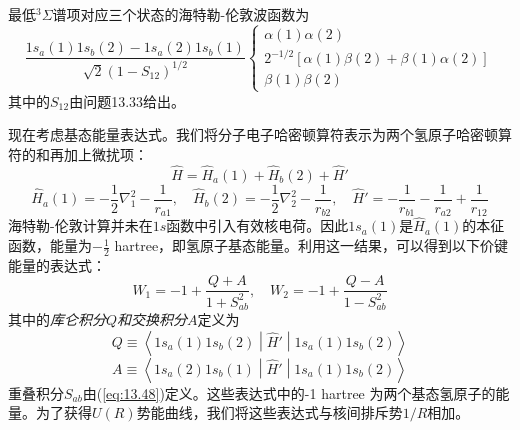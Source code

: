     最低$^3\Sigma$谱项对应三个状态的海特勒-伦敦波函数为
    \begin{equation}
        \frac{
            1s_a\left(1\right)1s_b\left(2\right) - 1s_a\left(2\right)1s_b\left(1\right)
        }{
            \sqrt{2}\left(1 - S_{12}\right)^{1/2}
        } \left\{ 
            \begin{array}{l}
                \alpha\left(1\right)\alpha\left(2\right) \\
                2^{-1/2}\left[\alpha\left(1\right)\beta\left(2\right) + \beta\left(1\right)\alpha\left(2\right)\right] \\
                \beta\left(1\right)\beta\left(2\right)
            \end{array}
            \right.
        \label{eq:13.101}
    \end{equation}
    其中的$S_{12}$由问题13.33给出。

    现在考虑基态能量表达式。我们将分子电子哈密顿算符表示为两个氢原子哈密顿算符的和再加上微扰项：
    \begin{equation}
        \hat{H} = \hat{H}_a\left(1\right) + \hat{H}_b\left(2\right) + \hat{H}'
        \label{eq:13.102}
    \end{equation}
    \begin{equation*}
        \hat{H}_a\left(1\right) = -\frac{1}{2}\nabla_1^2 - \frac{1}{r_{a1}}, \quad \hat{H}_b\left(2\right) = -\frac{1}{2}\nabla_2^2 - \frac{1}{r_{b2}}, \quad \hat{H}' = -\frac{1}{r_{b1}} - \frac{1}{r_{a2}} + \frac{1}{r_{12}}
    \end{equation*}
    海特勒-伦敦计算并未在$1s$函数中引入有效核电荷。因此$1s_a\left(1\right)$是$\hat{H}_a\left(1\right)$的本征函数，能量为$-\frac{1}{2}$ hartree，即氢原子基态能量。利用这一结果，可以得到以下价键能量的表达式：
    \begin{equation}
        W_1 = -1 + \frac{Q+A}{1+S_{ab}^2}, \quad W_2 = -1 + \frac{Q-A}{1-S_{ab}^2}
        \label{eq:13.103}
    \end{equation}
    其中的\textit{库仑积分$Q$和交换积分$A$}定义为
    \begin{equation}
        Q \equiv \left\langle 1s_a\left(1\right)1s_b\left(2\right) \middle| \hat{H}' \middle| 1s_a\left(1\right)1s_b\left(2\right) \right\rangle
        \label{eq:13.104}
    \end{equation}
    \begin{equation}
        A \equiv \left\langle 1s_a\left(2\right)1s_b\left(1\right) \middle| \hat{H}' \middle| 1s_a\left(1\right)1s_b\left(2\right) \right\rangle
        \label{eq:13.105}
    \end{equation}
    重叠积分$S_{ab}$由(\ref{eq:13.48})定义。这些表达式中的-1 hartree 为两个基态氢原子的能量。为了获得$U\left(R\right)$势能曲线，我们将这些表达式与核间排斥势$1/R$相加。

